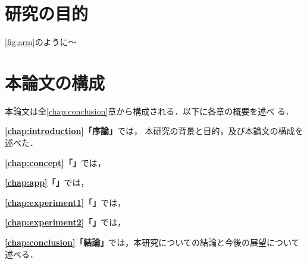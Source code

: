  \section{研究の目的}
\cref{fig:arm}のように〜


\section{本論文の構成}
本論文は全\ref{chap:conclusion}章から構成される．以下に各章の概要を述べ
る．

\textbf{\cref{chap:introduction}「序論」}では，
本研究の背景と目的，及び本論文の構成を述べた．
\cite{SINRIGAKU}

\textbf{\cref{chap:concept}「」}では，



\textbf{\cref{chap:app}「」}では，



\textbf{\cref{chap:experiment1}「」}では，



\textbf{\cref{chap:experiment2}「」}では，



\textbf{\cref{chap:conclusion}「結論」}では，本研究についての結論と今後の展望について述べる．
